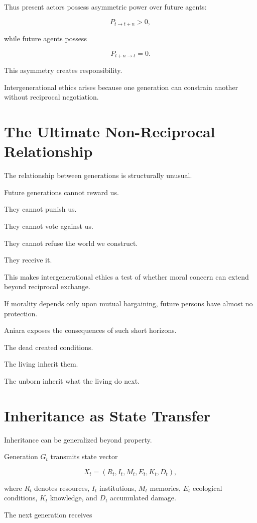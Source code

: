 \documentclass[11pt,oneside]{book}
\theoremstyle{definition}
\theoremstyle{remark}
\begin{document}
Thus present actors possess asymmetric power over future agents:

\[
P_{t\rightarrow t+n}>0,
\]

while future agents possess

\[
P_{t+n\rightarrow t}=0.
\]

This asymmetry creates responsibility.

Intergenerational ethics arises because one generation can constrain another without reciprocal negotiation.

\section{The Ultimate Non-Reciprocal Relationship}

The relationship between generations is structurally unusual.

Future generations cannot reward us.

They cannot punish us.

They cannot vote against us.

They cannot refuse the world we construct.

They receive it.

This makes intergenerational ethics a test of whether moral concern can extend beyond reciprocal exchange.

If morality depends only upon mutual bargaining, future persons have almost no protection.

Aniara exposes the consequences of such short horizons.

The dead created conditions.

The living inherit them.

The unborn inherit what the living do next.

\section{Inheritance as State Transfer}

Inheritance can be generalized beyond property.

Generation \(G_t\) transmits state vector

\[
X_t
=
(
R_t,
I_t,
M_t,
E_t,
K_t,
D_t
),
\]

where \(R_t\) denotes resources, \(I_t\) institutions, \(M_t\) memories, \(E_t\) ecological conditions, \(K_t\) knowledge, and \(D_t\) accumulated damage.

The next generation receives
\end{document}
